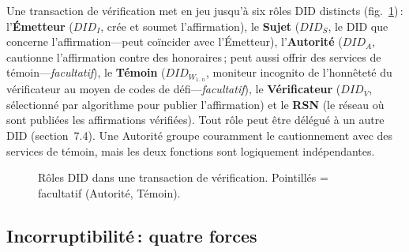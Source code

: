 \documentclass[11pt,a4paper,twocolumn]{article}
\begin{document}
Une transaction de vérification met en jeu jusqu'à six rôles DID distincts (fig.~\ref{fig:roles})\,: l'\textbf{Émetteur} ($DID_I$, crée et soumet l'affirmation), le \textbf{Sujet} ($DID_S$, le DID que concerne l'affirmation---peut coïncider avec l'Émetteur), l'\textbf{Autorité} ($DID_A$, cautionne l'affirmation contre des honoraires\,; peut aussi offrir des services de témoin---\emph{facultatif}), le \textbf{Témoin} ($DID_{W_{1..n}}$, moniteur incognito de l'honnêteté du vérificateur au moyen de codes de défi---\emph{facultatif}), le \textbf{Vérificateur} ($DID_V$, sélectionné par algorithme pour publier l'affirmation) et le \textbf{RSN} (le réseau où sont publiées les affirmations vérifiées). Tout rôle peut être délégué à un autre DID (section~7.4). Une Autorité groupe couramment le cautionnement avec des services de témoin, mais les deux fonctions sont logiquement indépendantes.

\begin{figure}[ht]
\centering
{}
\caption{Rôles DID dans une transaction de vérification. Pointillés = facultatif (Autorité, Témoin).}
\label{fig:roles}
\end{figure}

\subsection{Incorruptibilité\,: quatre forces}
\end{document}
